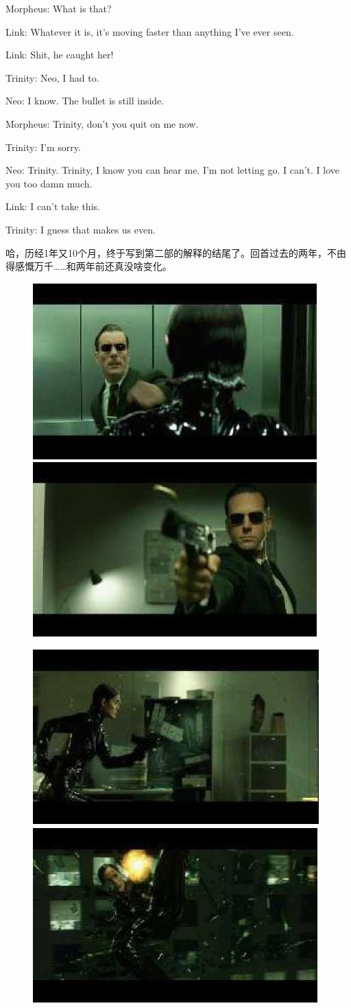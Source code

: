\documentclass{ctexart}
\newenvironment{myquote}{\color{green} \setlength{\leftskip}{6em} \setlength{\rightskip}{4em} \setlength{\parindent}{-2em}}{\par}
\begin{document}
\begin{myquote}
Morpheus: What is that?

Link: Whatever it is, it's moving faster than anything I've ever seen.

Link: Shit, he caught her!

Trinity: Neo, I had to.

Neo: I know. The bullet is still inside.

Morpheus: Trinity, don't you quit on me now.

Trinity: I'm sorry.

Neo: Trinity. Trinity, I know you can hear me. I'm not letting go. I can't. I love you too damn much.

Link: I can't take this.

Trinity: I guess that makes us even.
\end{myquote}

哈，历经1年又10个月，终于写到第二部的解释的结尾了。回首过去的两年，不由得感慨万千……和两年前还真没啥变化。

\begin{figure}[htb]
\centering
\includegraphics[width=0.45\linewidth]{fig/read_reloaded-170}
\includegraphics[width=0.45\linewidth]{fig/read_reloaded-170-1}

\vspace{3pt}

\includegraphics[width=0.45\linewidth]{fig/read_reloaded-170-2}
\includegraphics[width=0.45\linewidth]{fig/read_reloaded-170-3}
\end{figure}
\end{document}
